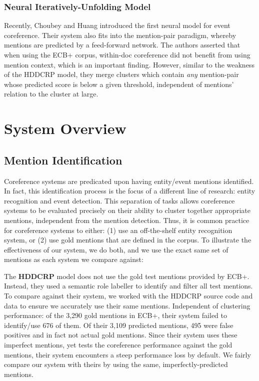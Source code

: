 \documentclass[11pt,a4paper]{article}
\begin{document}
\subsubsection{Neural Iteratively-Unfolding Model}
\label{sec:Choubey}
Recently, Choubey and Huang  introduced the first neural model for event coreference.  Their system also fits into the mention-pair paradigm, whereby mentions are predicted by a feed-forward network.  The authors asserted that when using the ECB+ corpus, within-doc coreference did not benefit from using mention context, which is an important finding.  However, similar to the weakness of the HDDCRP model, they merge clusters which contain \textit{any} mention-pair whose predicted score is below a given threshold, independent of mentions' relation to the cluster at large.


\section{System Overview}
\subsection{Mention Identification}
\label{sec:mentionid}
Coreference systems are predicated upon having entity/event mentions identified.  In fact, this identification process is the focus of a different line of research: entity recognition and event detection.  This separation of tasks allows coreference systems to be evaluated precisely on their ability to cluster together appropriate mentions, independent from the mention detection.  Thus, it is common practice for coreference systems to either: (1) use an off-the-shelf entity recognition system, or (2) use gold mentions that are defined in the corpus.  To illustrate the effectiveness of our system, we do both, and we use the exact same set of mentions as each system we compare against:


The \textbf{HDDCRP} model does not use the gold test mentions provided by ECB+.  Instead, they used a semantic role labeller to identify and filter all test mentions.
To compare against their system, we worked with the HDDCRP source code and data to ensure we accurately use their same mentions.  Independent of clustering performance: of the 3,290 gold mentions in ECB+, their system failed to identify/use 676 of them.  Of their 3,109 predicted mentions, 495 were false positives and in fact not actual gold mentions.  Since their system uses these imperfect mentions, yet tests the coreference performance against the gold mentions, their system encounters a steep performance loss by default.  We fairly compare our system with theirs by using the same, imperfectly-predicted mentions.
\end{document}
